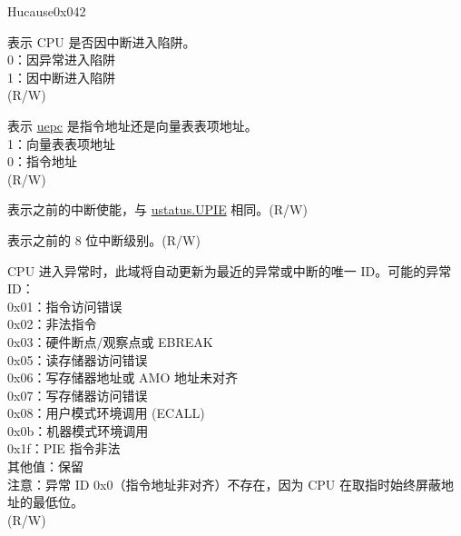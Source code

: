\begin{register}{H}{ucause}{0x042}\label{regdesc:UCAUSE}
%
%
%
%
%
%
%
%
\regnewline%
\begin{regdesc}\begin{reglist}
\label{fielddesc:UCAUSEINT} \item [INT] 表示 CPU 是否因中断进入陷阱。\\
0：因异常进入陷阱\\
1：因中断进入陷阱\\
(R/W)
\label{fielddesc:UCAUSE_UINHV}\item [UINHV] 表示 \hyperref[fielddesc:UEPC]{uepc} 是指令地址还是向量表表项地址。\\
1：向量表表项地址\\
0：指令地址\\
(R/W)
\label{fielddesc:UCAUSE_UPIE}\item [UPIE] 表示之前的中断使能，与 \hyperref[fielddesc:USTATUSUPIE]{ustatus.UPIE} 相同。(R/W)
\label{fielddesc:UCAUSE_UPIL}\item [UPIL] 表示之前的 8 位中断级别。(R/W)
\label{fielddesc:UCAUSECODE}\item [CODE] CPU 进入异常时，此域将自动更新为最近的异常或中断的唯一 ID。可能的异常 ID：\\
0x01：指令访问错误\\
0x02：非法指令\\
0x03：硬件断点/观察点或 EBREAK\\
0x05：读存储器访问错误\\
0x06：写存储器地址或 AMO 地址未对齐\\
0x07：写存储器访问错误\\
0x08：用户模式环境调用 (ECALL)\\
0x0b：机器模式环境调用\\
0x1f：PIE 指令非法\\
其他值：保留\\
注意：异常 ID 0x0（指令地址非对齐）不存在，因为 CPU 在取指时始终屏蔽地址的最低位。\\
(R/W)
\end{reglist}\end{regdesc}
\end{register}


